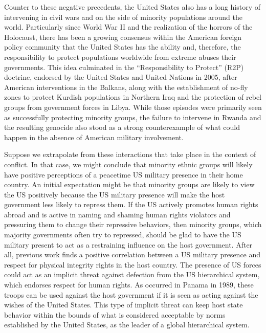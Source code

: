 Counter to these negative precedents, the United States also has a long history of intervening in civil wars and on the side of minority populations around the world. Particularly since World War II and the realization of the horrors of the Holocaust, there has been a growing consensus within the American foreign policy community that the United States has the ability and, therefore, the responsibility to protect populations worldwide from extreme abuses their governments. This idea culminated in the ``Responsibility to Protect'' (R2P) doctrine, endorsed by the United States and United Nations in 2005, after American interventions in the Balkans, along with the establishment of no-fly zones to protect Kurdish populations in Northern Iraq and the protection of rebel groups from government forces in Libya. While those episodes were primarily seen as successfully protecting minority groups, the failure to intervene in Rwanda and the resulting genocide also stood as a strong counterexample of what could happen in the absence of American military involvement. 

Suppose we extrapolate from these interactions that take place in the context of conflict. In that case, we might conclude that minority ethnic groups will likely have positive perceptions of a peacetime US military presence in their home country.  An initial expectation might be that minority groups are likely to view the US positively because the US military presence will make the host government less likely to repress them. If the US actively promotes human rights abroad and is active in naming and shaming human rights violators and pressuring them to change their repressive behaviors, then minority groups, which majority governments often try to repressed, should be glad to have the US military present to act as a restraining influence on the host government. After all, previous work finds a positive correlation between a US military presence and respect for physical integrity rights in the host country.\cite{bell2017} The presence of US forces could act as an implicit threat against defection from the US hierarchical system, which endorses respect for human rights. As occurred in Panama in 1989, these troops can be used against the host government if it is seen as acting against the wishes of the United States. This type of implicit threat can keep host state behavior within the bounds of what is considered acceptable by norms established by the United States, as the leader of a global hierarchical system.\cite{Towns2012} 

